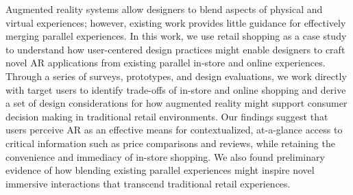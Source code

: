 Augmented reality systems allow designers to blend aspects of physical and virtual experiences; however, existing work provides little guidance for effectively merging parallel experiences. In this work, we use retail shopping as a case study to understand how user-centered design practices might enable designers to craft novel AR applications from existing parallel in-store and online experiences. Through a series of surveys, prototypes, and design evaluations, we work directly with target users to identify trade-offs of in-store and online shopping and derive a set of design considerations for how augmented reality might support consumer decision making in traditional retail environments. Our findings suggest that users perceive AR as an effective means for contextualized, at-a-glance access to critical information such as price comparisons and reviews, while retaining the convenience and immediacy of in-store shopping. We also found preliminary evidence of how blending existing parallel experiences might inspire novel immersive interactions that transcend traditional retail experiences. 
